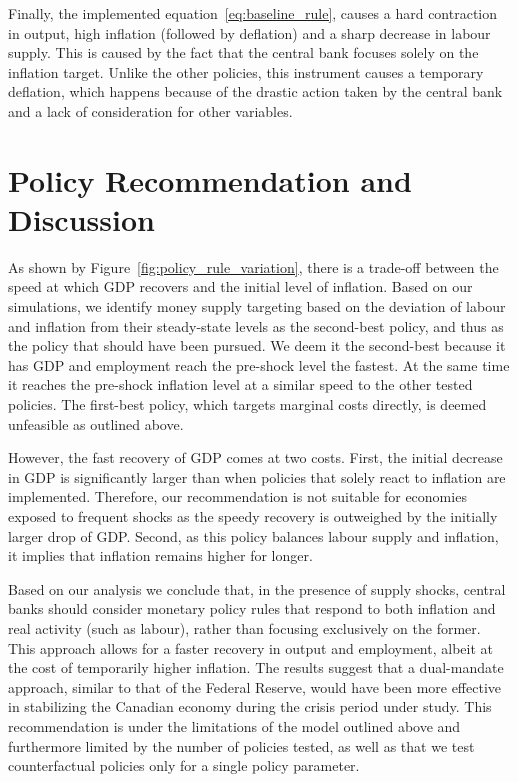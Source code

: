 \documentclass[12pt]{article}
\begin{document}
Finally, the implemented equation~\ref{eq:baseline_rule}, causes a hard contraction in output, high inflation (followed by deflation) and a sharp decrease in labour supply. This is caused by the fact that the central bank focuses solely on the inflation target. Unlike the other policies, this instrument causes a temporary deflation, which happens because of the drastic action taken by the central bank and a lack of consideration for other variables.



\section{Policy Recommendation and Discussion }\label{s:discussion}

As shown by Figure~\ref{fig:policy_rule_variation}, there is a trade-off between the speed at which GDP recovers and the initial level of inflation. Based on our simulations, we identify money supply targeting based on the deviation of labour and inflation from their steady-state levels as the second-best policy, and thus as the policy that should have been pursued. We deem it the second-best because it has GDP and employment reach the pre-shock level the fastest. At the same time it reaches the pre-shock inflation level at a similar speed to the other tested policies. The first-best policy, which targets marginal costs directly, is deemed unfeasible as outlined above. 

However, the fast recovery of GDP comes at two costs. First, the initial decrease in GDP is significantly larger than when policies that solely react to inflation are implemented. Therefore, our recommendation is not suitable for economies exposed to frequent shocks as the speedy recovery is outweighed by the initially larger drop of GDP. Second, as this policy balances labour supply and inflation, it implies that inflation remains higher for longer.  

Based on our analysis we conclude that, in the presence of supply shocks, central banks should consider monetary policy rules that respond to both inflation and real activity (such as labour), rather than focusing exclusively on the former. This approach allows for a faster recovery in output and employment, albeit at the cost of temporarily higher inflation. The results suggest that a dual-mandate approach, similar to that of the Federal Reserve, would have been more effective in stabilizing the Canadian economy during the crisis period under study. This recommendation is under the limitations of the model outlined above and furthermore limited by the number of policies tested, as well as that we test counterfactual policies only for a single policy parameter. 
\end{document}
